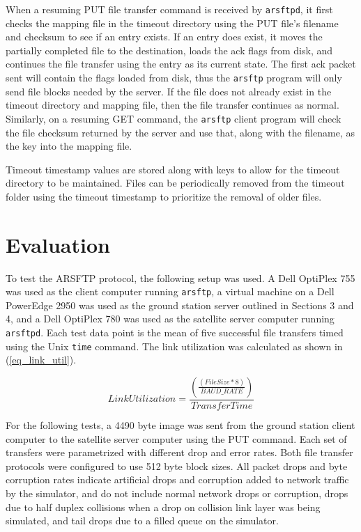 \documentclass[journal]{./IEEEtran}
\begin{document}
When a resuming PUT file transfer command is received by {\tt arsftpd}, it first checks the mapping file in the timeout directory using the PUT file’s filename and checksum to see if an entry exists.  If an entry does exist, it moves the partially completed file to the destination, loads the ack flags from disk, and continues the file transfer using the entry as its current state.  The first ack packet sent will contain the flags loaded from disk, thus the {\tt arsftp} program will only send file blocks needed by the server.  If the file does not already exist in the timeout directory and mapping file, then the file transfer continues as normal.  Similarly, on a resuming GET command, the {\tt arsftp} client program will check the file checksum returned by the server and use that, along with the filename, as the key into the mapping file.

Timeout timestamp values are stored along with keys to allow for the timeout directory to be maintained.  Files can be periodically removed from the timeout folder using the timeout timestamp to prioritize the removal of older files.

\section{Evaluation}
To test the ARSFTP protocol, the following setup was used. A Dell OptiPlex 755 was used as the client computer running {\tt arsftp}, a virtual machine on a Dell PowerEdge 2950 was used as the ground station server outlined in Sections 3 and 4, and a Dell OptiPlex 780 was used as the satellite server computer running {\tt arsftpd}. Each test data point is the mean of five successful file transfers timed using the Unix {\tt time} command.  The link utilization was calculated as shown in (\ref{eq_link_util}).

\begin{equation}
\label{eq_link_util}
Link Utilization =\frac{\left(\frac{\left(File Size*8\right)}{BAUD\_RATE}\right)}{Transfer Time}
\end{equation}

For the following tests, a 4490 byte image was sent from the ground station client computer to the satellite server computer using the PUT command. Each set of transfers were parametrized with different drop and error rates. Both file transfer protocols were configured to use 512 byte block sizes.  All packet drops and byte corruption rates indicate artificial drops and corruption added to network traffic by the simulator, and do not include normal network drops or corruption, drops due to half duplex collisions when a drop on collision link layer was being simulated, and tail drops due to a filled queue on the simulator.
\end{document}
